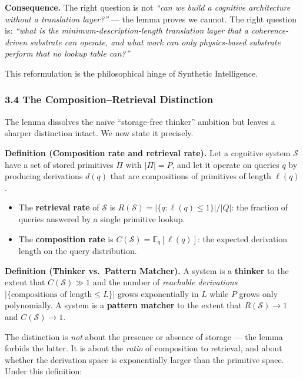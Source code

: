 \documentclass[
  11pt,
  a4paper,
]{article}
\providecommand{\tightlist}{%
  \setlength{\itemsep}{0pt}\setlength{\parskip}{0pt}}
\begin{document}
\textbf{Consequence.} The right question is not \emph{``can we build a
cognitive architecture without a translation layer?''} --- the lemma
proves we cannot. The right question is: \emph{``what is the
minimum-description-length translation layer that a coherence-driven
substrate can operate, and what work can only physics-based substrate
perform that no lookup table can?''}

This reformulation is the philosophical hinge of Synthetic Intelligence.

\subsubsection{3.4 The Composition--Retrieval
Distinction}\label{the-compositionretrieval-distinction}

The lemma dissolves the naïve ``storage-free thinker'' ambition but
leaves a sharper distinction intact. We now state it precisely.

\textbf{Definition (Composition rate and retrieval rate).} Let a
cognitive system \(\mathcal{S}\) have a set of stored primitives \(\Pi\)
with \(|\Pi| = P\), and let it operate on queries \(q\) by producing
derivations \(d(q)\) that are compositions of primitives of length
\(\ell(q)\).

\begin{itemize}
\tightlist
\item
  The \textbf{retrieval rate} of \(\mathcal{S}\) is
  \(R(\mathcal{S}) = |\{q : \ell(q) \leq 1\}| / |Q|\): the fraction of
  queries answered by a single primitive lookup.
\item
  The \textbf{composition rate} is
  \(C(\mathcal{S}) = \mathbb{E}_q[\ell(q)]\): the expected derivation
  length on the query distribution.
\end{itemize}

\textbf{Definition (Thinker vs.~Pattern Matcher).} A system is a
\textbf{thinker} to the extent that \(C(\mathcal{S}) \gg 1\) and the
number of \emph{reachable derivations}
\(|\{\text{compositions of length} \leq L\}|\) grows exponentially in
\(L\) while \(P\) grows only polynomially. A system is a \textbf{pattern
matcher} to the extent that \(R(\mathcal{S}) \to 1\) and
\(C(\mathcal{S}) \to 1\).

The distinction is \emph{not} about the presence or absence of storage
--- the lemma forbids the latter. It is about the \emph{ratio} of
composition to retrieval, and about whether the derivation space is
exponentially larger than the primitive space. Under this definition:
\end{document}
